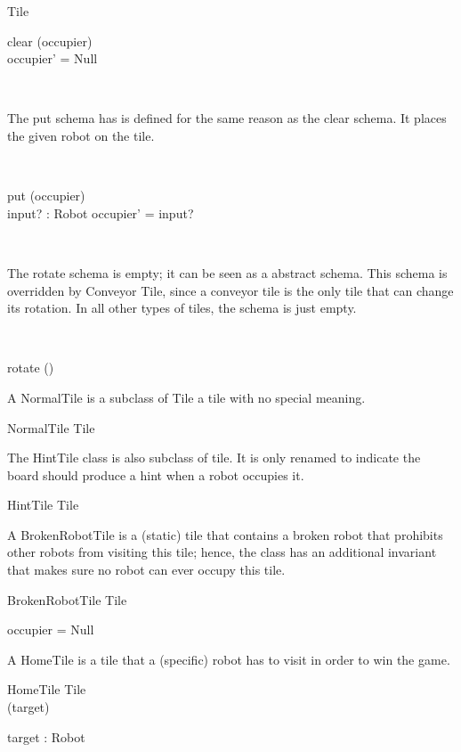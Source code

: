 \documentclass[12pt]{article}
\begin{document}
\begin{class}{Tile}
\begin{schema}{clear}
\Delta (occupier) \\
\where
occupier' = Null
\end{schema} \\
\begin{zpar}
The put schema has is defined for the same reason as the clear schema. It places the given robot on the tile.
\end{zpar}\\
\begin{schema}{put}
\Delta (occupier) \\
input? : Robot
\where
occupier' = input?
\end{schema} \\
\begin{zpar}
The rotate schema is empty; it can be seen as a abstract schema. This schema is overridden by Conveyor Tile, since a conveyor tile is the only tile that can change its rotation. In all other types of tiles, the schema is just empty.
\end{zpar} \\
\begin{schema}{rotate}
\Delta()
\end{schema}
\end{class}

A NormalTile is a subclass of Tile  a tile with no special meaning.
\begin{class}{NormalTile}
Tile
\end{class}

The HintTile class is also subclass of tile. It is only renamed to indicate the board should produce a hint when a robot occupies it.
\begin{class}{HintTile}
Tile
\end{class}

A BrokenRobotTile is a (static) tile that contains a broken robot that prohibits other robots from visiting this tile; hence, the class has an additional invariant that makes sure no robot can ever occupy this tile.
\begin{class}{BrokenRobotTile}
Tile \\
\begin{state}
occupier = Null
\end{state}
\end{class}

A HomeTile is a tile that a (specific) robot has to visit in order to win the game.
\begin{class}{HomeTile}
Tile \\
\upharpoonright (target) \\
\begin{state}
target : Robot
\end{state}
\end{class}
\end{document}
